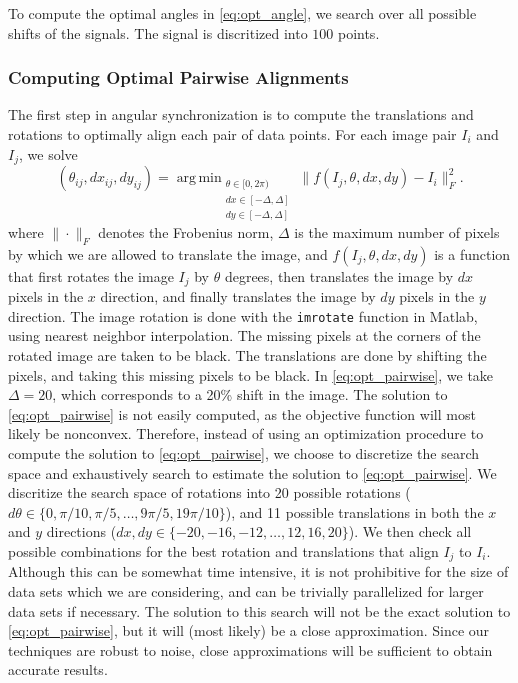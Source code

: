 \documentclass[11pt]{article}
\DeclareMathOperator*{\argmin}{arg\,min}
\begin{document}
To compute the optimal angles in \eqref{eq:opt_angle}, we search over all possible shifts of the signals. 
%
The signal is discritized into $100$ points.

\subsubsection{Computing Optimal Pairwise Alignments}
The first step in angular synchronization is to compute the translations and rotations to optimally align each pair of data points. 
%
For each image pair $I_i$ and $I_j$, we solve
\begin{equation}\label{eq:opt_pairwise}
(\theta_{ij}, dx_{ij}, dy_{ij}) = \argmin_{
\begin{matrix}
\theta \in [0, 2\pi) \\ 
dx \in [-\Delta, \Delta]\\ 
dy \in [-\Delta, \Delta]
\end{matrix}
} \|f(I_j, \theta, dx, dy) - I_i \|_F^2.
\end{equation}
where $\| \cdot \|_F$ denotes the Frobenius norm, $\Delta$ is the maximum number of pixels by which we are allowed to translate the image, and $f(I_j, \theta, dx, dy)$ is a function that first rotates the image $I_j$ by $\theta$ degrees, then translates the image by $dx$ pixels in the $x$ direction, and finally translates the image by $dy$ pixels in the $y$ direction. 
%
The image rotation is done with the \texttt{imrotate} function in Matlab, using nearest neighbor interpolation.
%
The missing pixels at the corners of the rotated image are taken to be black.
%
The translations are done by shifting the pixels, and taking this missing pixels to be black. 
%
In \eqref{eq:opt_pairwise}, we take $\Delta=20$, which corresponds to a 20\% shift in the image. 
%
The solution to \eqref{eq:opt_pairwise} is not easily computed, as the objective function will most likely be nonconvex.
%
Therefore, instead of using an optimization procedure to compute the solution to \eqref{eq:opt_pairwise}, we choose to discretize the search space and exhaustively search to estimate the solution to \eqref{eq:opt_pairwise}.
%
We discritize the search space of rotations into 20 possible rotations ($d\theta  \in \{0, \pi/10, \pi/5, \dots, 9 \pi/5, 19\pi/10 \}$), and 11 possible translations in both the $x$ and $y$ directions ($dx, dy \in \{-20, -16, -12, \dots, 12, 16, 20 \}$). 
%
We then check all possible combinations for the best rotation and translations that align $I_j$ to $I_i$. 
%
Although this can be somewhat time intensive, it is not prohibitive for the size of data sets which we are considering, and can be trivially parallelized for larger data sets if necessary.
%
The solution to this search will not be the exact solution to \eqref{eq:opt_pairwise}, but it will (most likely) be a close approximation.
%
Since our techniques are robust to noise, close approximations will be sufficient to obtain accurate results.
\end{document}
